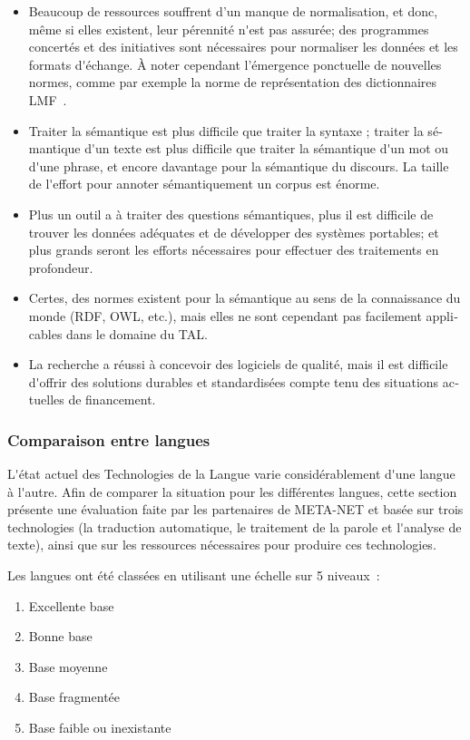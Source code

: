\documentclass[]{../metanetpaper}
\begin{document}
\begin{french}
\begin{multicols}{2}
\begin{itemize}
\item Beaucoup de ressources souffrent d'un manque de normalisation,
  et donc, même si elles existent, leur pérennité n{\mbox '}est pas
  assurée; des programmes concertés et des initiatives sont
  nécessaires pour normaliser les données et les formats d{\mbox
    '}échange. À noter cependant l'émergence ponctuelle de nouvelles
  normes, comme par exemple la norme de représentation des dictionnaires LMF~\cite{LMF}.

\item Traiter la sémantique est plus difficile que traiter la syntaxe ;
traiter la sémantique d{\mbox '}un texte est plus difficile que traiter la
sémantique d{\mbox '}un mot ou d{\mbox '}une phrase, et encore davantage pour la sémantique
du discours. La taille de l{\mbox '}effort pour annoter sémantiquement un
corpus est énorme.

\item Plus un outil a à traiter des questions sémantiques, plus il est
difficile de trouver les données adéquates et de développer des
systèmes portables; et plus grands seront les efforts nécessaires pour
effectuer des traitements en profondeur.

\item Certes, des normes existent pour la sémantique au sens de la
connaissance du monde (RDF, OWL, etc.), mais elles ne sont cependant
pas facilement applicables dans le domaine du TAL.

\item La recherche a réussi à concevoir des logiciels de qualité, mais il
est difficile d{\mbox '}offrir des solutions durables et standardisées compte
tenu des situations actuelles de financement.
\end{itemize}

\subsubsection{Comparaison entre langues}

L{\mbox '}état actuel des Technologies de la Langue varie considérablement
d{\mbox '}une langue à l{\mbox '}autre. Afin de comparer la situation pour les
différentes langues, cette section présente une évaluation faite par
les partenaires de META-NET et basée sur trois technologies (la
traduction automatique, le traitement de la parole et l{\mbox '}analyse de
texte), ainsi que sur les ressources nécessaires pour produire ces
technologies.

Les langues ont été classées en utilisant une échelle sur 5 niveaux~:
\begin{enumerate}
\item Excellente base
\item Bonne base
\item Base moyenne
\item Base fragmentée
\item Base faible ou inexistante
\end{enumerate}


\end{multicols}
\end{french}
\end{document}
